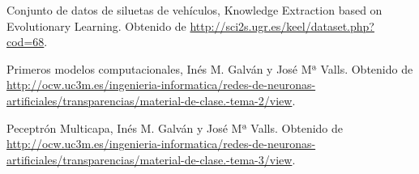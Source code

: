 \documentclass[11pt,spanish,listoffigures,listoftables]{workluis}
\begin{document}

\begin{thebibliography}{10}


   Conjunto de datos de siluetas de vehículos, 
   \newblock Knowledge Extraction based on Evolutionary Learning. 
   \newblock Obtenido de
   \url{http://sci2s.ugr.es/keel/dataset.php?cod=68}.

   Primeros modelos computacionales, 
   \newblock Inés M. Galván y José Mª Valls.
   \newblock Obtenido de
   \url{http://ocw.uc3m.es/ingenieria-informatica/redes-de-neuronas-artificiales/transparencias/material-de-clase.-tema-2/view}.

   Peceptrón Multicapa, 
   \newblock Inés M. Galván y José Mª Valls.
   \newblock Obtenido de
   \url{http://ocw.uc3m.es/ingenieria-informatica/redes-de-neuronas-artificiales/transparencias/material-de-clase.-tema-3/view}.

\end{thebibliography}
\cleardoublepage

\end{document}
